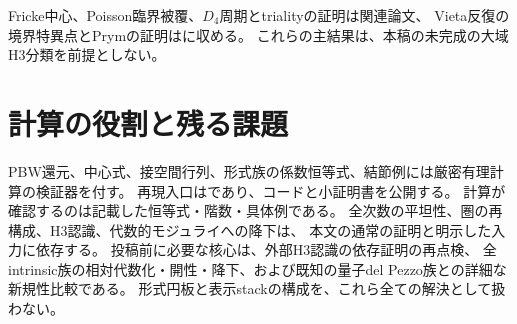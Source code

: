\documentclass[11pt,a4paper]{ltjsarticle}
\begin{document}
Fricke中心、Poisson臨界被覆、$D_4$周期とtrialityの証明は関連論文\cite{CompanionFricke}、
Vieta反復の境界特異点とPrymの証明は\cite{CompanionBoundary}に収める。
これらの主結果は、本稿の未完成の大域H3分類を前提としない。

\tableofcontents












\section{計算の役割と残る課題}
PBW還元、中心式、接空間行列、形式族の係数恒等式、結節例には厳密有理計算の検証器を付す。
再現入口はであり、コードと小証明書を公開する。
計算が確認するのは記載した恒等式・階数・具体例である。
全次数の平坦性、圏の再構成、H3認識、代数的モジュライへの降下は、
本文の通常の証明と明示した入力に依存する。
投稿前に必要な核心は、外部H3認識の依存証明の再点検、
全intrinsic族の相対代数化・開性・降下、および既知の量子del Pezzo族との詳細な新規性比較である。
形式円板と表示stackの構成を、これら全ての解決として扱わない。

\end{document}

